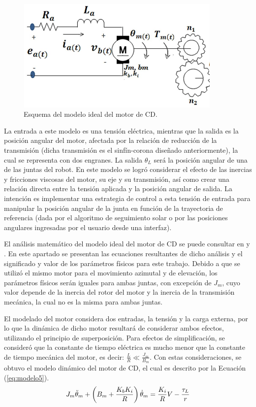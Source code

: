 \begin{figure}[H]
	\centering
	\includegraphics[width=10cm]{imagenes/modelo3}
	\caption{Esquema del modelo ideal del motor de CD.}
	\label{fig:modelo3}
\end{figure}

La entrada a este modelo es una tensión eléctrica, mientras que la salida es la posición angular del motor, afectada por la relación de reducción de la transmisión (dicha transmisión es el sinfín-corona diseñado anteriormente), la cual se representa con dos engranes. La salida $ \theta_L $ será la posición angular de una de las juntas del robot. En este modelo se logró considerar el efecto de las inercias y fricciones viscosas del motor, su eje y su transmisión, así como crear una relación directa entre la tensión aplicada y la posición angular de salida. La intención es implementar una estrategia de control a esta tensión de entrada para manipular la posición angular de la junta en función de la trayectoria de referencia (dada por el algoritmo de seguimiento solar o por las posiciones angulares ingresadas por el usuario desde una interfaz).

El análisis matemático del modelo ideal del motor de CD se puede consultar en \cite{DDA11} y \cite{DDA13}. En este apartado se presentan las ecuaciones resultantes de dicho análisis y el significado y valor de los parámetros físicos para este trabajo. Debido a que se utilizó el mismo motor para el movimiento azimutal y de elevación, los parámetros físicos serán iguales para ambas juntas, con excepción de $ J_m $, cuyo valor depende de la inercia del rotor del motor y la inercia de la transmisión mecánica, la cual no es la misma para ambas juntas.

El modelado del motor considera dos entradas, la tensión y la carga externa, por lo que la dinámica de dicho motor resultará de considerar ambos efectos, utilizando el principio de superposición. Para efectos de simplificación, se consideró que la constante de tiempo eléctrica es mucho menor que la constante de tiempo mecánica del motor, es decir: $ \frac{L}{R} \ll \frac{J_m}{B_m} $. Con estas consideraciones, se obtuvo el modelo dinámico del motor de CD, el cual es descrito por la Ecuación (\ref{eq:modelo5}).
\begin{equation} \label{eq:modelo5}
    J_m \Ddot{\theta}_m+\left(B_m+\frac{K_b K_i}{R}\right) \Dot{\theta}_m=\frac{K_i}{R}V-\frac{\tau_L}{r}
\end{equation}

